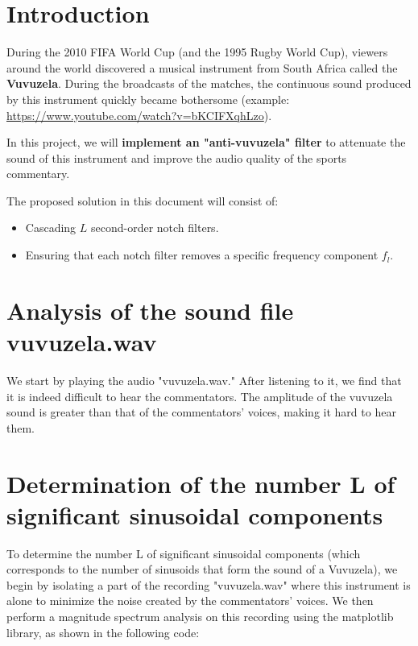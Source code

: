 \section*{Introduction}
During the 2010 FIFA World Cup (and the 1995 Rugby World Cup), viewers around the world discovered a musical instrument from South Africa called the \textbf{Vuvuzela}. During the broadcasts of the matches, the continuous sound produced by this instrument quickly became bothersome (example: \url{https://www.youtube.com/watch?v=bKCIFXqhLzo}).

In this project, we will \textbf{implement an "anti-vuvuzela" filter} to attenuate the sound of this instrument and improve the audio quality of the sports commentary.

The proposed solution in this document will consist of:
\begin{itemize}
\item Cascading $L$ second-order notch filters.
\item Ensuring that each notch filter removes a specific frequency component $f_l$.
\end{itemize}

\section{Analysis of the sound file vuvuzela.wav}
We start by playing the audio "vuvuzela.wav." After listening to it, we find that it is indeed difficult to hear the commentators. The amplitude of the vuvuzela sound is greater than that of the commentators' voices, making it hard to hear them.

\section{Determination of the number L of significant sinusoidal components}
To determine the number L of significant sinusoidal components (which corresponds to the number of sinusoids that form the sound of a Vuvuzela), we begin by isolating a part of the recording "vuvuzela.wav" where this instrument is alone to minimize the noise created by the commentators' voices. We then perform a magnitude spectrum analysis on this recording using the matplotlib library, as shown in the following code:



